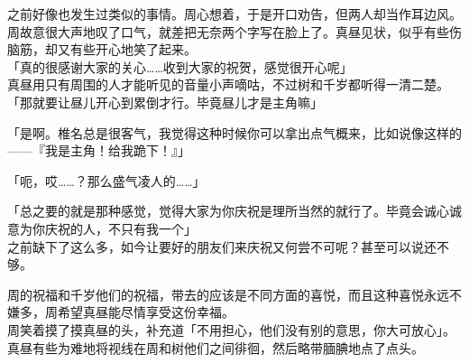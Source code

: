 之前好像也发生过类似的事情。周心想着，于是开口劝告，但两人却当作耳边风。\\

周故意很大声地叹了口气，就差把无奈两个字写在脸上了。真昼见状，似乎有些伤脑筋，却又有些开心地笑了起来。\\

「真的很感谢大家的关心……收到大家的祝贺，感觉很开心呢」\\

真昼用只有周围的人才能听见的音量小声嘀咕，不过树和千岁都听得一清二楚。\\

「那就要让昼儿开心到累倒才行。毕竟昼儿才是主角嘛」

「是啊。椎名总是很客气，我觉得这种时候你可以拿出点气概来，比如说像这样的——『我是主角！给我跪下！』」

「呃，哎……？那么盛气凌人的……」

「总之要的就是那种感觉，觉得大家为你庆祝是理所当然的就行了。毕竟会诚心诚意为你庆祝的人，不只有我一个」\\

之前缺下了这么多，如今让要好的朋友们来庆祝又何尝不可呢？甚至可以说还不够。

周的祝福和千岁他们的祝福，带去的应该是不同方面的喜悦，而且这种喜悦永远不嫌多，周希望真昼能尽情享受这份幸福。\\

周笑着摸了摸真昼的头，补充道「不用担心，他们没有别的意思，你大可放心」。真昼有些为难地将视线在周和树他们之间徘徊，然后略带腼腆地点了点头。
